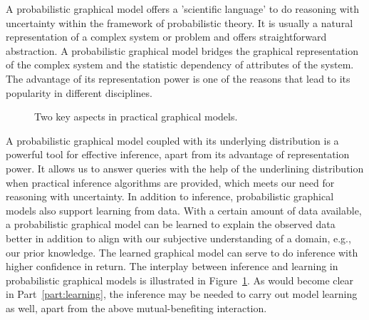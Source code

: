 A probabilistic graphical model offers a 'scientific language' to do reasoning with uncertainty within the framework of probabilistic theory. It is usually a natural representation of a complex system or problem and offers straightforward abstraction. A probabilistic graphical model bridges the graphical representation of the complex system and the statistic dependency of attributes of the system.
The advantage of its representation power is one of the reasons that lead to its popularity in different disciplines.

\begin{figure}[!t]
  \centering
  \caption{Two key aspects in practical graphical models.}
  \label{fig:intro-pgm}
\end{figure}

A probabilistic graphical model coupled with its underlying distribution is a powerful tool for effective inference, apart from its advantage of representation power. It allows us to answer queries with the help of the underlining distribution when practical inference algorithms are provided, which meets our need for reasoning with uncertainty. In addition to inference, probabilistic graphical models also support learning from data. With a certain amount of data available, a probabilistic graphical model can be learned to explain the observed data better in addition to align with our subjective understanding of a domain, e.g., our prior knowledge. The learned graphical model can serve to do inference with higher confidence in return. The interplay between inference and learning in probabilistic graphical models is illustrated in Figure~\ref{fig:intro-pgm}. As would become clear in Part~\ref{part:learning}, the inference may be needed to carry out model learning as well, apart from the above mutual-benefiting interaction.



